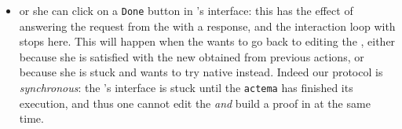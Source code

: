 \begin{itemize}
  \item or she can click on a \texttt{Done} button in 's interface:
  this has the effect of answering the  request from the
   with a  response, and the interaction loop with
   stops here. This will happen when the  wants to go
  back to editing the , either because she is satisfied with
  the new  obtained from previous actions, or because she is stuck
  and wants to try native   instead. Indeed our protocol is
  \emph{synchronous}: the 's interface is stuck until the
  \texttt{actema}  has finished its execution, and thus one cannot
  edit the  \emph{and} build a proof in  at the same
  time.
\end{itemize}

